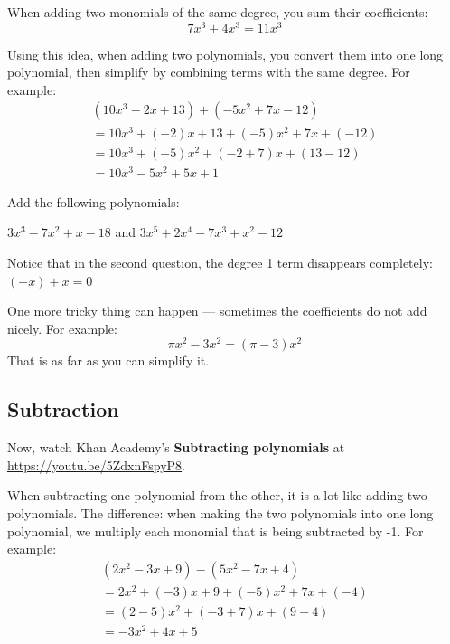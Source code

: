 When adding two monomials of the same degree, you sum their coefficients:
\begin{equation*}
  7x^3 + 4x^3 = 11x^3
\end{equation*}

Using this idea, when adding two polynomials, you convert them into one long
polynomial, then simplify by combining terms with the same degree. For example:
\begin{multline*}
  (10x^3 - 2x + 13) + (-5x^2 + 7x -12) \\
  = 10x^3 + (-2)x + 13 + (-5)x^2 + 7x + (-12) \\
  = 10x^3 + (-5)x^2 + (-2 + 7)x + (13 - 12) \\
  = 10x^3 - 5x^2 + 5x + 1
\end{multline*}

\begin{Exercise}[title=Adding Polynomials Practice, label=addpns]
  Add the following polynomials:
  \vspace{20mm}
  \vspace{20mm}
\end{Exercise}
\begin{Answer}[ref=addpns]$3x^3 - 7x^2 + x - 18$ and $3x^5 + 2x^4 - 7x^3 + x^2 - 12$\end{Answer}

Notice that in the second question, the degree 1 term disappears completely: $(-x) + x = 0$

One more tricky thing can happen --- sometimes the coefficients do not add nicely.  For example:
\begin{equation*}
  \pi x^2 - 3 x^2 = (\pi - 3) x^2
\end{equation*}
That is as far as you can simplify it.
    
\subsection{Subtraction}
Now, watch Khan Academy's \textbf{Subtracting polynomials} at \url{https://youtu.be/5ZdxnFspyP8}.

When subtracting one polynomial from the other, it is a lot like
adding two polynomials. The difference: when making the two polynomials
into one long polynomial, we multiply each monomial that is being
subtracted by -1. For example:
\begin{multline*}
  (2x^2 - 3x + 9) - (5x^2 - 7x + 4) \\
  = 2x^2 + (-3)x + 9 + (-5)x^2 + 7x + (-4) \\
  = (2 - 5)x^2 + (-3 + 7)x + (9-4) \\
  = -3x^2 + 4x + 5
\end{multline*}

